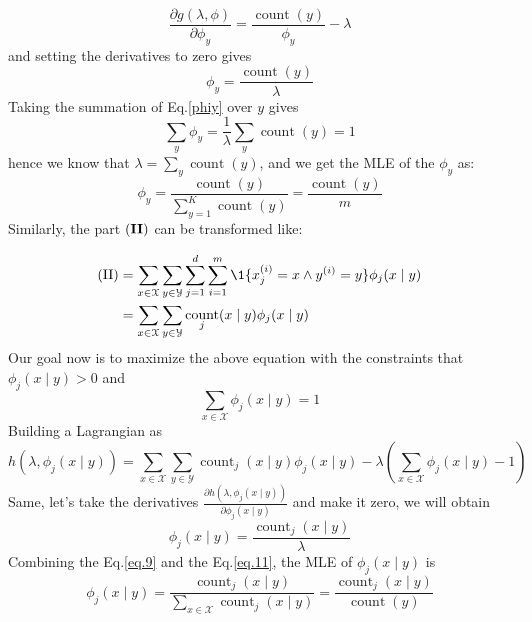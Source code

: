 \documentclass[a4paper, 12pt, answers]{exam}
\DeclareMathOperator{\C}{count}
\begin{document}
\begin{questions}
\begin{solution}
\begin{equation}
\frac{\partial g(\lambda, \phi)}{\partial \phi_y} = \frac{\C(y)}{\phi_y} - \lambda
\end{equation}
and setting the derivatives to zero gives
\begin{equation} \label{phiy}
\phi_y = \frac{\C(y)}{\lambda}
\end{equation}
Taking the summation of Eq.\eqref{phiy} over $y$ gives
\begin{equation}
\sum_y \phi_y = \frac1{\lambda} \sum_y \C(y) = 1
\end{equation}
hence we know that $\lambda = \sum_y \C(y)$, and we get the MLE of the $\phi_y$ as:
\begin{equation}
\phi_y = \frac{\C(y)}{\sum_{y=1}^K \C(y)} = \frac{\C(y)}{m}
\end{equation}
Similarly, the part $(\bf{II})$ can be transformed like:

\begin{equation}
\begin{aligned}
({\rm II}) &= \sum_{x\in\mathcal{X}}\sum_{y \in \mathcal{Y}}\sum_{j=1}^d \sum_{i=1}^m \1\{x_j^{(i)}=x \land y^{(i)}=y\} \phi_j(x \mid y) \\
&= \sum_{x\in\mathcal{X}}\sum_{y \in \mathcal{Y}} \C_j(x\mid y) \phi_j(x \mid y)
\end{aligned}
\end{equation}
Our goal now is to maximize the above equation with the constraints that $\phi_j(x\mid y) > 0$ and 
\begin{equation} \label{eq.9}
\sum_{x\in \mathcal{X}} \phi_j(x\mid y) = 1
\end{equation}
Building a Lagrangian as
\begin{equation}
h(\lambda, \phi_j(x\mid y)) = \sum_{x\in\mathcal{X}}\sum_{y \in \mathcal{Y}} \C_j(x\mid y) \phi_j(x \mid y) - \lambda \left (\sum_{x\in \mathcal{X}} \phi_j(x \mid y) - 1 \right )
\end{equation}
Same, let's take the derivatives $\frac{\partial h(\lambda, \phi_j(x\mid y))}{\partial \phi_j(x\mid y)}$ and make it zero, we will obtain
\begin{equation} \label{eq.11}
\phi_j(x\mid y) = \frac{\C_j(x\mid y)}{\lambda}
\end{equation}
Combining the Eq.\eqref{eq.9} and the Eq.\eqref{eq.11}, the MLE of $\phi_j(x\mid y)$ is
\begin{equation}
\phi_j(x\mid y) = \frac{\C_j(x\mid y)}{\sum_{x\in\mathcal{X}} \C_j(x\mid y)} = \frac{\C_j(x\mid y)}{\C(y)}
\end{equation}


\end{solution}
\end{questions}
\end{document}
